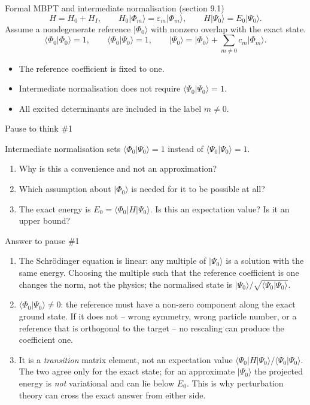 \documentclass[aspectratio=169,10pt]{beamer}
\newcounter{thinkctr}
\newcommand{\thinkq}[2]{%
  \stepcounter{thinkctr}%
  \vfill
  \begin{tcolorbox}[enhanced,colback=palewarm,colframe=warm,boxrule=1.2pt,arc=4pt,
    grow to left by=6mm,grow to right by=6mm,
    left=16pt,right=16pt,top=16pt,bottom=18pt,
    fonttitle=\bfseries\Large,fontupper=\Large,
    title={Pause to think \#\thethinkctr\hfill\mdseries\normalsize(about #1 min -- discuss with your neighbour)}]
  #2
  \end{tcolorbox}
  \vfill}
\newcommand{\thinka}[1]{%
  \vfill
  \begin{tcolorbox}[enhanced,colback=paleteal,colframe=teal,boxrule=1.2pt,arc=4pt,
    grow to left by=6mm,grow to right by=6mm,
    left=16pt,right=16pt,top=16pt,bottom=18pt,
    fonttitle=\bfseries\Large,fontupper=\large,
    title={Answer to pause \#\thethinkctr}]
  #1
  \end{tcolorbox}
  \vfill}
\newcommand{\ket}[1]{\vert #1\rangle}
\newcommand{\braket}[2]{\langle #1\vert #2\rangle}
\newcommand{\mel}[3]{\langle #1\lvert #2\rvert #3\rangle}
\newcommand{\ph}{\Phi_0}
\newcommand{\Psizero}{\Psi_0}
\begin{document}
\begin{frame}{Formal MBPT and intermediate normalisation (section 9.1)}
\[
H=H_0+H_I,\qquad H_0\ket{\Phi_m}=\varepsilon_m\ket{\Phi_m},
\qquad H\ket{\Psizero}=E_0\ket{\Psizero}.
\]
Assume a nondegenerate reference \(\ket{\ph}\) with nonzero overlap with the exact state.
\[
\braket{\ph}{\ph}=1,\qquad
\boxed{\braket{\ph}{\Psizero}=1},\qquad
\ket{\Psizero}=\ket{\ph}+\sum_{m\ne0}c_m\ket{\Phi_m}.
\]
\begin{itemize}
\item The reference coefficient is fixed to one.
\item Intermediate normalisation does not require \(\braket{\Psizero}{\Psizero}=1\).
\item All excited determinants are included in the label \(m\ne0\).
\end{itemize}
\end{frame}

\begin{frame}{Pause to think \#1}
\thinkq{3}{Intermediate normalisation sets \(\braket{\ph}{\Psizero}=1\) instead of \(\braket{\Psizero}{\Psizero}=1\).
\begin{enumerate}
\item Why is this a convenience and not an approximation?
\item Which assumption about \(\ket{\ph}\) is needed for it to be possible at all?
\item The exact energy is \(E_0=\mel{\ph}{H}{\Psizero}\). Is this an expectation value? Is it an upper bound?
\end{enumerate}}
\end{frame}

\begin{frame}{Answer to pause \#1}
\thinka{%
\begin{enumerate}
\item The Schr\"odinger equation is linear: any multiple of \(\ket{\Psizero}\) is a solution with the same energy. Choosing the multiple such that the reference coefficient is one changes the norm, not the physics; the normalised state is \(\ket{\Psizero}/\sqrt{\braket{\Psizero}{\Psizero}}\).
\item \(\braket{\ph}{\Psizero}\ne0\): the reference must have a non-zero component along the exact ground state. If it does not -- wrong symmetry, wrong particle number, or a reference that is orthogonal to the target -- no rescaling can produce the coefficient one.
\item It is a \emph{transition} matrix element, not an expectation value \(\mel{\Psizero}{H}{\Psizero}/\braket{\Psizero}{\Psizero}\). The two agree only for the exact state; for an approximate \(\ket{\Psizero}\) the projected energy is \emph{not} variational and can lie below \(E_0\). This is why perturbation theory can cross the exact answer from either side.
\end{enumerate}}
\end{frame}
\end{document}
